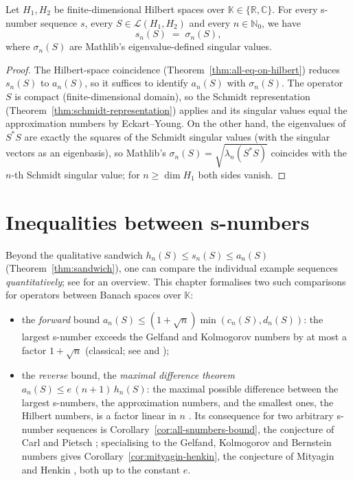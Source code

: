 \begin{theorem}
\label{thm:sn-eq-singular-values}
\leanok
{}
Let $H_1, H_2$ be finite-dimensional Hilbert spaces over
$\mathbb{K} \in \{\mathbb{R}, \mathbb{C}\}$. For every s-number sequence
$s$, every $S \in \mathcal{L}(H_1, H_2)$ and every $n \in \mathbb{N}_0$,
we have
\[
  s_n(S) \;=\; \sigma_n(S),
\]
where $\sigma_n(S)$ are Mathlib's eigenvalue-defined singular values.
\end{theorem}
\begin{proof}
\leanok
{}
The Hilbert-space coincidence (Theorem~\ref{thm:all-eq-on-hilbert}) reduces
$s_n(S)$ to $a_n(S)$, so it suffices to identify $a_n(S)$ with
$\sigma_n(S)$. The operator $S$ is compact (finite-dimensional domain), so
the Schmidt representation (Theorem~\ref{thm:schmidt-representation})
applies and its singular values equal the approximation numbers by
Eckart--Young. On the other hand, the eigenvalues of $S^* S$ are exactly
the squares of the Schmidt singular values (with the singular vectors as
an eigenbasis), so Mathlib's $\sigma_n(S) = \sqrt{\lambda_n(S^* S)}$
coincides with the $n$-th Schmidt singular value; for
$n \ge \dim H_1$ both sides vanish.
\end{proof}

\chapter{Inequalities between s-numbers}
\label{ch:inequalities}

Beyond the qualitative sandwich $h_n(S) \le s_n(S) \le a_n(S)$
(Theorem~\ref{thm:sandwich}), one can compare the individual example
sequences \emph{quantitatively}; see \cite{U24} for an overview. This chapter
formalises two such comparisons for operators between Banach spaces over
$\mathbb{K}$:

\begin{itemize}
  \item the \emph{forward} bound $a_n(S) \le (1+\sqrt{n})\min(c_n(S), d_n(S))$:
        the largest s-number exceeds the Gelfand and Kolmogorov numbers by
        at most a factor $1+\sqrt{n}$ (classical; see \cite{Pietsch-s} and
        \cite[\S 2.10]{Pietsch87});
  \item the \emph{reverse} bound, the \emph{maximal difference theorem}
        $a_n(S) \le e\,(n+1)\, h_n(S)$: the maximal possible difference
        between the largest s-numbers, the approximation numbers, and the
        smallest ones, the Hilbert numbers, is a factor linear in $n$
        \cite{U26}. Its consequence for two arbitrary s-number
        sequences is Corollary~\ref{cor:all-snumbers-bound}, the conjecture of
        Carl and Pietsch \cite{CP78}; specialising to the Gelfand, Kolmogorov
        and Bernstein numbers gives Corollary~\ref{cor:mityagin-henkin}, the
        conjecture of Mityagin and Henkin \cite{MH}, both up to the
        constant $e$.
\end{itemize}

